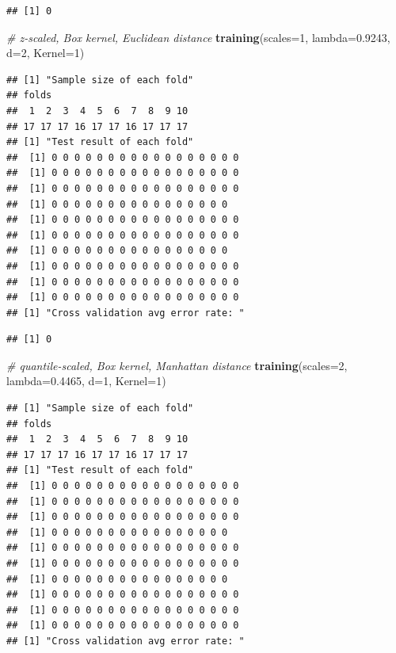 \documentclass[12pt]{article}
\newenvironment{Shaded}{\begin{snugshade}}{\end{snugshade}}
\newcommand{\AttributeTok}[1]{\textcolor[rgb]{0.13,0.29,0.53}{#1}}
\newcommand{\CommentTok}[1]{\textcolor[rgb]{0.56,0.35,0.01}{\textit{#1}}}
\newcommand{\DecValTok}[1]{\textcolor[rgb]{0.00,0.00,0.81}{#1}}
\newcommand{\FloatTok}[1]{\textcolor[rgb]{0.00,0.00,0.81}{#1}}
\newcommand{\FunctionTok}[1]{\textcolor[rgb]{0.13,0.29,0.53}{\textbf{#1}}}
\newcommand{\NormalTok}[1]{#1}
\begin{document}
\begin{verbatim}
## [1] 0
\end{verbatim}

\begin{Shaded}
\begin{Highlighting}[]
\CommentTok{\# z{-}scaled, Box kernel, Euclidean distance}
\FunctionTok{training}\NormalTok{(}\AttributeTok{scales=}\DecValTok{1}\NormalTok{, }\AttributeTok{lambda=}\FloatTok{0.9243}\NormalTok{, }\AttributeTok{d=}\DecValTok{2}\NormalTok{, }\AttributeTok{Kernel=}\DecValTok{1}\NormalTok{)}
\end{Highlighting}
\end{Shaded}

\begin{verbatim}
## [1] "Sample size of each fold"
## folds
##  1  2  3  4  5  6  7  8  9 10 
## 17 17 17 16 17 17 16 17 17 17 
## [1] "Test result of each fold"
##  [1] 0 0 0 0 0 0 0 0 0 0 0 0 0 0 0 0 0
##  [1] 0 0 0 0 0 0 0 0 0 0 0 0 0 0 0 0 0
##  [1] 0 0 0 0 0 0 0 0 0 0 0 0 0 0 0 0 0
##  [1] 0 0 0 0 0 0 0 0 0 0 0 0 0 0 0 0
##  [1] 0 0 0 0 0 0 0 0 0 0 0 0 0 0 0 0 0
##  [1] 0 0 0 0 0 0 0 0 0 0 0 0 0 0 0 0 0
##  [1] 0 0 0 0 0 0 0 0 0 0 0 0 0 0 0 0
##  [1] 0 0 0 0 0 0 0 0 0 0 0 0 0 0 0 0 0
##  [1] 0 0 0 0 0 0 0 0 0 0 0 0 0 0 0 0 0
##  [1] 0 0 0 0 0 0 0 0 0 0 0 0 0 0 0 0 0
## [1] "Cross validation avg error rate: "
\end{verbatim}

\begin{verbatim}
## [1] 0
\end{verbatim}

\begin{Shaded}
\begin{Highlighting}[]
\CommentTok{\# quantile{-}scaled, Box kernel, Manhattan distance}
\FunctionTok{training}\NormalTok{(}\AttributeTok{scales=}\DecValTok{2}\NormalTok{, }\AttributeTok{lambda=}\FloatTok{0.4465}\NormalTok{, }\AttributeTok{d=}\DecValTok{1}\NormalTok{, }\AttributeTok{Kernel=}\DecValTok{1}\NormalTok{)}
\end{Highlighting}
\end{Shaded}

\begin{verbatim}
## [1] "Sample size of each fold"
## folds
##  1  2  3  4  5  6  7  8  9 10 
## 17 17 17 16 17 17 16 17 17 17 
## [1] "Test result of each fold"
##  [1] 0 0 0 0 0 0 0 0 0 0 0 0 0 0 0 0 0
##  [1] 0 0 0 0 0 0 0 0 0 0 0 0 0 0 0 0 0
##  [1] 0 0 0 0 0 0 0 0 0 0 0 0 0 0 0 0 0
##  [1] 0 0 0 0 0 0 0 0 0 0 0 0 0 0 0 0
##  [1] 0 0 0 0 0 0 0 0 0 0 0 0 0 0 0 0 0
##  [1] 0 0 0 0 0 0 0 0 0 0 0 0 0 0 0 0 0
##  [1] 0 0 0 0 0 0 0 0 0 0 0 0 0 0 0 0
##  [1] 0 0 0 0 0 0 0 0 0 0 0 0 0 0 0 0 0
##  [1] 0 0 0 0 0 0 0 0 0 0 0 0 0 0 0 0 0
##  [1] 0 0 0 0 0 0 0 0 0 0 0 0 0 0 0 0 0
## [1] "Cross validation avg error rate: "
\end{verbatim}
\end{document}
